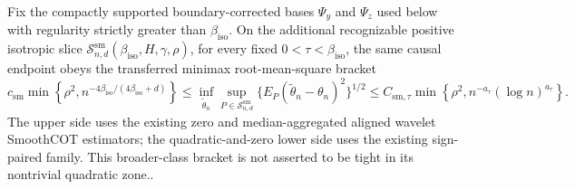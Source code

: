 \documentclass{article}
\begin{document}
Fix the compactly supported boundary-corrected bases \(\Psi_y\) and \(\Psi_z\) used below with regularity strictly greater than \(\beta_{\mathrm{iso}}\). On the additional recognizable positive isotropic slice \(\mathcal S^{\mathrm{sm}}_{n,d}(\beta_{\mathrm{iso}},H,\gamma,\rho)\), for every fixed \(0<\tau<\beta_{\mathrm{iso}}\), the same causal endpoint obeys the transferred minimax root-mean-square bracket
\[
c_{\mathrm{sm}}\min\!\left\{\rho^2,n^{-4\beta_{\mathrm{iso}}/(4\beta_{\mathrm{iso}}+d)}\right\}
\le \inf_{\widetilde\theta_n}\sup_{P\in\mathcal S^{\mathrm{sm}}_{n,d}}
\{E_P(\widetilde\theta_n-\theta_n)^2\}^{1/2}
\le C_{\mathrm{sm},\tau}\min\!\left\{\rho^2,n^{-a_\tau}(\log n)^{a_\tau}\right\}.
\]
The upper side uses the existing zero and median-aggregated aligned wavelet SmoothCOT estimators; the quadratic-and-zero lower side uses the existing sign-paired family. This broader-class bracket is not asserted to be tight in its nontrivial quadratic zone..
\end{document}
